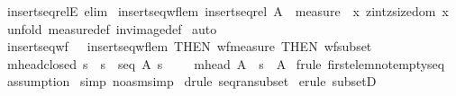 \begin{isabellebody}
\isamarkupfalse%
\ insertseq{\isacharunderscore}relE\ {\isacharbrackleft}elim{\isacharbang}{\isacharbrackright}\isanewline
\isanewline
\isanewline
{}\isamarkupfalse%
\ insertseq{\isacharunderscore}wf{\isacharunderscore}lem{\isacharcolon}\ {\isachardoublequoteopen}insertseq{\isacharunderscore}rel\ A\ {\isacharless}{\isacharequal}\ measure\ {\isacharparenleft}{\isacharpercent}\ x{\isachardot}\ zint{\isacharparenleft}zsize{\isacharparenleft}dom\ x{\isacharparenright}{\isacharparenright}{\isacharparenright}{\isachardoublequoteclose}\isanewline
%
\isadelimproof
%
\endisadelimproof
%
\isatagproof
{}\isamarkupfalse%
\ {\isacharparenleft}unfold\ measure{\isacharunderscore}def\ inv{\isacharunderscore}image{\isacharunderscore}def{\isacharparenright}\isanewline
{}\isamarkupfalse%
\ auto\isanewline
\isanewline
{}\isamarkupfalse%
%
\endisatagproof
{\isafoldproof}%
%
\isadelimproof
\isanewline
%
\endisadelimproof
\isanewline
\isanewline
{}\isamarkupfalse%
\ insertseq{\isacharunderscore}wf\ {\isacharequal}\ \ insertseq{\isacharunderscore}wf{\isacharunderscore}lem\ {\isacharbrackleft}THEN\ wf{\isacharunderscore}measure\ {\isacharbrackleft}THEN\ wf{\isacharunderscore}subset{\isacharbrackright}{\isacharbrackright}\ \isanewline
\isanewline
\isanewline
{}\isamarkupfalse%
\ mhead{\isacharunderscore}closed{\isacharcolon}\ {\isachardoublequoteopen}{\isacharbang}{\isacharbang}s{\isachardot}\ {\isacharbrackleft}{\isacharbar}\ s\ {\isacharcolon}\ seq\ A{\isacharsemicolon}\ s\ {\isachartilde}{\isacharequal}\ {\isacharpercent}{\isacharless}{\isacharpercent}{\isachargreater}\ {\isacharbar}{\isacharbrackright}\ {\isacharequal}{\isacharequal}{\isachargreater}\ mhead\ A\ {\isacharpercent}{\isacharcircum}\ s\ {\isacharcolon}\ A{\isachardoublequoteclose}\isanewline
%
\isadelimproof
%
\endisadelimproof
%
\isatagproof
{}\isamarkupfalse%
\ {\isacharparenleft}frule\ first{\isacharunderscore}elem{\isacharunderscore}notemptyseq{\isacharparenright}\isanewline
{}\isamarkupfalse%
\ {\isacharparenleft}assumption{\isacharparenright}\isanewline
{}\isamarkupfalse%
\ {\isacharparenleft}simp\ {\isacharparenleft}no{\isacharunderscore}asm{\isacharunderscore}simp{\isacharparenright}{\isacharparenright}\isanewline
{}\isamarkupfalse%
\ {\isacharparenleft}drule\ seq{\isacharunderscore}ran{\isacharunderscore}subset{\isacharparenright}\isanewline
{}\isamarkupfalse%
\ {\isacharparenleft}erule\ subsetD{\isacharparenright}\isanewline

\end{isabellebody}
